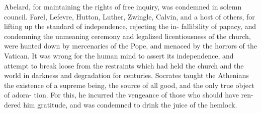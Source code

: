 \documentclass[10pt]{article}
\begin{document}
\begin{multicols}{3}
	Abelard, for maintaining the rights of free inquiry, was condemned in\linebreak
	solemn council. Farel, Lefevre, Hutton, Luther, Zwingle, Calvin, and a\linebreak
	host of others, for lifting up the standard of independence, rejecting the in-\linebreak
	fallibility of papacy, and condemning the unmeaning ceremony and\linebreak
	legalized licentiousness of the church, were hunted down by mercenaries of\linebreak
	the Pope, and menaced by the horrors of the Vatican. It was wrong for\linebreak
	the human mind to assert its independence, and attempt to break loose from\linebreak
	the restraints which had held the church and the world in darkness and\linebreak
	degradation for centuries. Socrates taught the Athenians the existence of\linebreak
	a supreme being, the source of all good, and the only true object of adora-\linebreak
	tion. For this, he incurred the vengeance of those who should have ren-\linebreak
	dered him gratitude, and was condemned to drink the juice of the hemlock.


\end{multicols}
\end{document}

